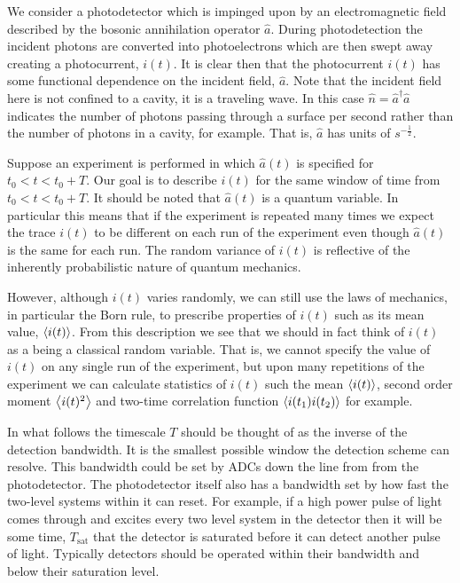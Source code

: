 \documentclass[12pt]{article}
\begin{document}
We consider a photodetector which is impinged upon by an electromagnetic field described by the bosonic annihilation operator $\hat{a}$. During photodetection the incident photons are converted into photoelectrons which are then swept away creating a photocurrent, $i(t)$. It is clear then that the photocurrent $i(t)$ has some functional dependence on the incident field, $\hat{a}$. Note that the incident field here is not confined to a cavity, it is a traveling wave. In this case $\hat{n} = \hat{a}^{\dag} \hat{a}$ indicates the number of photons passing through a surface per second rather than the number of photons in a cavity, for example. That is, $\hat{a}$ has units of $s^{-\frac{1}{2}}$.

Suppose an experiment is performed in which $\hat{a}(t)$ is specified for $t_0<t<t_0+T$. Our goal is to describe $i(t)$ for the same window of time from $t_0<t<t_0+T$. It should be noted that $\hat{a}(t)$ is a quantum variable. In particular this means that if the experiment is repeated many times we expect the trace $i(t)$ to be different on each run of the experiment even though $\hat{a}(t)$ is the same for each run. The random variance of $i(t)$ is reflective of the inherently probabilistic nature of quantum mechanics.

However, although $i(t)$ varies randomly, we can still use the laws of mechanics, in particular the Born rule, to prescribe properties of $i(t)$ such as its mean value, $\Braket{i(t)}$. From this description we see that we should in fact think of $i(t)$ as a being a classical random variable. That is, we cannot specify the value of $i(t)$ on any single run of the experiment, but upon many repetitions of the experiment we can calculate statistics of $i(t)$ such the mean $\Braket{i(t)}$, second order moment $\Braket{i(t)^2}$ and two-time correlation function $\Braket{i(t_1)i(t_2)}$ for example.

In what follows the timescale $T$ should be thought of as the inverse of the detection bandwidth. It is the smallest possible window the detection scheme can resolve. This bandwidth could be set by ADCs down the line from from the photodetector. The photodetector itself also has a bandwidth set by how fast the two-level systems within it can reset. For example, if a high power pulse of light comes through and excites every two level system in the detector then it will be some time, $T_{\text{sat}}$ that the detector is saturated before it can detect another pulse of light. Typically detectors should be operated within their bandwidth and below their saturation level.
\end{document}
